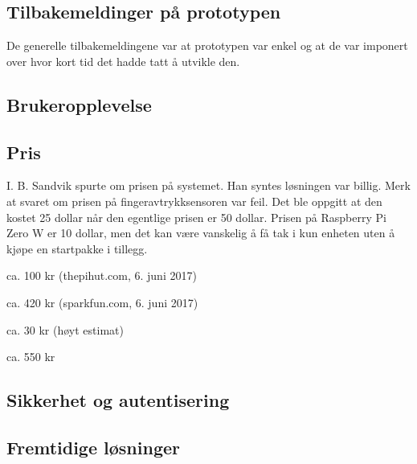 \subsection{Tilbakemeldinger på prototypen}
De generelle tilbakemeldingene var at prototypen var enkel og at de var imponert over hvor kort tid det hadde tatt å utvikle den.

\subsection{Brukeropplevelse}
\subsection{Pris}
I. B. Sandvik spurte om prisen på systemet. Han syntes løsningen var billig. Merk at svaret om prisen på fingeravtrykksensoren var feil.
Det ble oppgitt at den kostet 25 dollar når den egentlige prisen er 50 dollar. Prisen på Raspberry Pi Zero W er 10 dollar, men det kan
være vanskelig å få tak i kun enheten uten å kjøpe en startpakke i tillegg.

\begin{description}[leftmargin=!,labelwidth=\widthof{\bfseries Knapp, lysdioder, annet}]
    \item[Raspberry Pi Zero W:] ca. 100 kr (thepihut.com, 6. juni 2017)
    \item[GT511-C3:] ca. 420 kr (sparkfun.com, 6. juni 2017)
    \item[Knapp, lysdioder, annet:] ca. 30 kr (høyt estimat)
    \item[Totalsum:] ca. 550 kr
\end{description}

\subsection{Sikkerhet og autentisering}
\subsection{Fremtidige løsninger}



\def\tightlist{}

